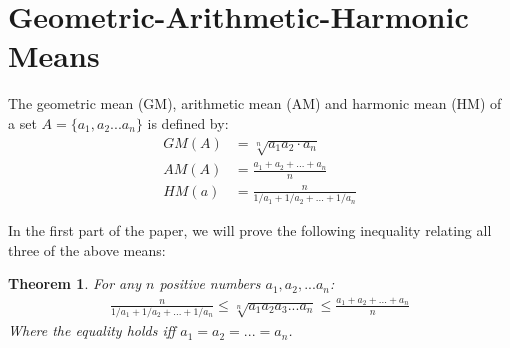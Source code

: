 \documentclass[12pt]{extreport}
\newtheorem*{thm}{Theorem}
\begin{document}
\section*{Geometric-Arithmetic-Harmonic Means}
The geometric mean (GM), arithmetic mean (AM) and harmonic mean (HM) of a set $A = \{a_1, a_2 ... a_n\}$ is defined by:
\begin{align*}
 GM(A) &= \sqrt[n]{a_1a_2 \cdot a_n} \\
 AM(A) &= \frac{a_1 + a_2 + ... + a_n}{n} \\
 HM(a) &= \frac{n}{1/a_1 + 1/a_2 + ... + 1/a_n}
\end{align*} 

In the first part of the paper, we will prove the following inequality relating all three of the above means: 
\begin{thm}
For any $n$ positive numbers $a_1, a_2, ... a_n$: 
\begin{align*}
\frac{n}{1/a_1 + 1/a_2 + ... + 1/a_n} \leq \sqrt[n]{a_1 a_2 a_3 ... a_n} \leq \frac{a_1 + a_2 + ... + a_n}{n}
\end{align*}
Where the equality holds iff $a_1 = a_2 = ... = a_n$.
\end{thm}
\end{document}

